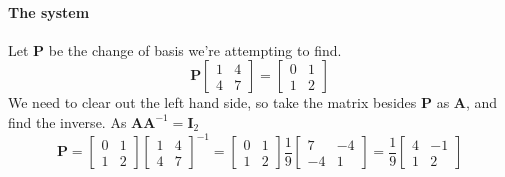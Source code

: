 \documentclass{article}
\begin{document}
            \paragraph{The system}
                Let $\mathbf{P}$ be the change of basis we're attempting to find.
                \[
                    \mathbf{P}\begin{bmatrix}1 & 4\\4 & 7\end{bmatrix}
                    =
                    \begin{bmatrix}0 & 1\\1 & 2\end{bmatrix}
                \]
                We need to clear out the left hand side, so take the matrix besides $\mathbf{P}$
                as $\mathbf{A}$, and find the inverse. As $\mathbf{A}\mathbf{A}^{-1}=\mathbf{I}_2$
                \[
                    \mathbf{P}=
                    \begin{bmatrix}0 & 1\\1 & 2\end{bmatrix}
                    \begin{bmatrix}1 & 4\\4 & 7\end{bmatrix}^{-1}
                    =
                    \begin{bmatrix}0 & 1\\1 & 2\end{bmatrix}
                    \frac{1}{9}
                    \begin{bmatrix}7 & -4\\-4 & 1\end{bmatrix}
                    =
                    \frac{1}{9}
                    \begin{bmatrix}4 & -1\\1 & 2\end{bmatrix}
                \]
\end{document}
